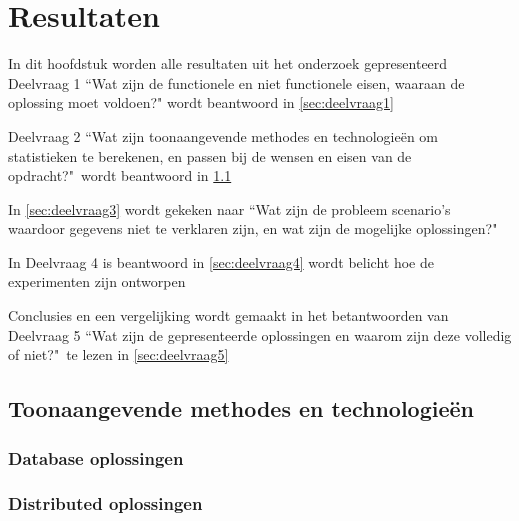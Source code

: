 \chapter{Resultaten}

In dit hoofdstuk worden alle resultaten uit het onderzoek gepresenteerd
Deelvraag 1 ``Wat zijn de functionele en niet functionele eisen, waaraan de oplossing moet voldoen?" wordt beantwoord in \ref{sec:deelvraag1}

Deelvraag 2 ``Wat zijn toonaangevende methodes en technologieën om statistieken te berekenen, en passen bij de wensen en eisen van de opdracht?"\  wordt beantwoord in \ref{sec:deelvraag2}

In \ref{sec:deelvraag3} wordt gekeken naar ``Wat zijn de probleem scenario's waardoor gegevens niet te verklaren zijn, en wat zijn de mogelijke oplossingen?"\

In Deelvraag 4 is beantwoord in \ref{sec:deelvraag4} wordt belicht hoe de experimenten zijn ontworpen

Conclusies en een vergelijking wordt gemaakt in het betantwoorden van Deelvraag 5 ``Wat zijn de gepresenteerde oplossingen en waarom zijn deze volledig of niet?"\ te lezen in \ref{sec:deelvraag5}


\clearpage



\clearpage

\section{Toonaangevende methodes en technologieën}
\label{sec:deelvraag2}


\newpage

\subsection{Database oplossingen}
\label{sec:databases}

\clearpage

\subsection{Distributed oplossingen}
\label{sec:distributed}

\clearpage

